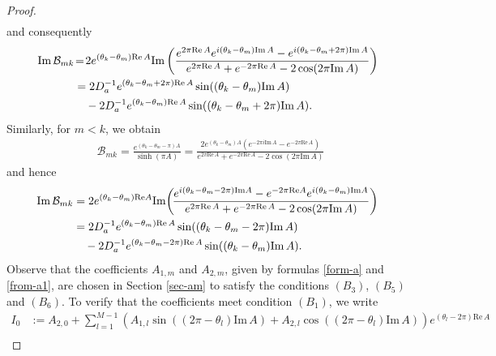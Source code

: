 \documentclass[11pt, letterpaper, reqno]{amsart}
\numberwithin{equation}{section}
\theoremstyle{definition}
\theoremstyle{plain}
\numberwithin{equation}{section}
\begin{document}
\begin{proof}
\begin{align*}
\end{align*}
and consequently 
\begin{equation}
\hspace{-6pt}\begin{aligned}
\mathrm{Im}\,\mathcal{B}_{mk} & \!=\! 2e^{(\theta_{k}-\theta_{m})\mathrm{Re}\,A}\mathrm{Im}\left(\frac{e^{2\pi\mathrm{Re}\,A}e^{i(\theta_{k}-\theta_{m})\mathrm{Im}\,A} - e^{i(\theta_{k}-\theta_{m}+2\pi)\mathrm{Im}\,A}}{e^{2\pi\mathrm{Re}\,A} + e^{-2\pi\mathrm{Re}\,A} - 2\cos(2\pi\mathrm{Im}\,A)} \right) \\
& = 2D_{a}^{-1}e^{(\theta_{k}-\theta_{m}+2\pi)\mathrm{Re}\,A}\sin((\theta_{k}-\theta_{m})\mathrm{Im}\,A)  \\
& \quad - 2D_{a}^{-1}e^{(\theta_{k}-\theta_{m})\mathrm{Re}\,A}\sin((\theta_{k}-\theta_{m}+2\pi)\mathrm{Im}\,A).
\end{aligned}
\end{equation}
Similarly, for $m<k$, we obtain
\begin{align*}
\mathcal{B}_{mk} = \frac{e^{(\theta_{k}-\theta_{m} - \pi) A}}{\sinh(\pi A)} = \frac{2e^{(\theta_{k}-\theta_{m})A}\left(e^{-2\pi i\mathrm{Im}\,A}-e^{-2\pi\mathrm{Re}\,A}\right)}{e^{2\pi\mathrm{Re}\,A} + e^{-2\pi\mathrm{Re}\,A} - 2\cos(2\pi\mathrm{Im}\,A)} 
\end{align*}
and hence
\begin{equation}\label{im-b-3}
\hspace{-7pt}\begin{aligned}
\mathrm{Im}\,\mathcal{B}_{mk} & = 2e^{(\theta_{k}-\theta_{m})\mathrm{Re}A}\mathrm{Im}\!\left(\!\frac{e^{i(\theta_{k}-\theta_{m}-2\pi)\mathrm{Im}A} - e^{-2\pi\mathrm{Re}A}e^{i(\theta_{k}-\theta_{m})\mathrm{Im}A}}{e^{2\pi\mathrm{Re}\,A} + e^{-2\pi\mathrm{Re}\,A} - 2\cos(2\pi\mathrm{Im}\,A)} \right) \\
& = 2D_{a}^{-1}e^{(\theta_{k}-\theta_{m})\mathrm{Re}\,A}\sin((\theta_{k}-\theta_{m}-2\pi)\mathrm{Im}\,A)  \\
& \quad - 2D_{a}^{-1}e^{(\theta_{k}-\theta_{m}-2\pi)\mathrm{Re}\,A}\sin((\theta_{k}-\theta_{m})\mathrm{Im}\,A).
\end{aligned}
\end{equation}
Observe that the coefficients $A_{1,m}$ and $A_{2,m}$, given by formulas \eqref{form-a} and \eqref{from-a1}, are chosen in Section \ref{sec-am} to satisfy the conditions $(B_{3})$, $(B_{5})$ and $(B_{6})$. To verify that the coefficients meet condition $(B_{1})$, we write 
\begin{align*}
I_{0}\!&:=\! A_{2,0} \!+\! \sum_{l=1}^{M-1}\!(A_{1,l}\sin((2\pi - \theta_{l})\mathrm{Im}\,A)\!+\!A_{2,l}\cos((2\pi - \theta_{l})\mathrm{Im}\,A))e^{(\theta_{l}-2\pi)\mathrm{Re}\,A} \\

\end{align*}
\end{proof}
\end{document}
